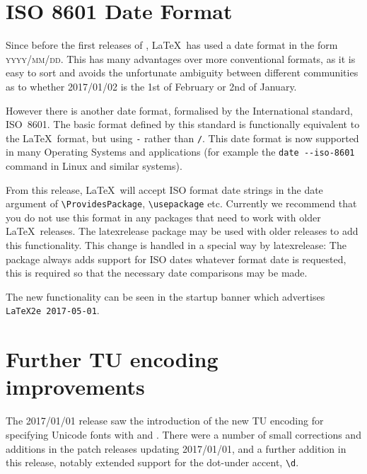 \documentclass{ltnews}
\begin{document}
\maketitle
\tableofcontents

\setlength{}

\section{ISO 8601 Date Format}
Since before the first releases of \LaTeXe, \LaTeX\ has used a date
format in the form \textsc{yyyy/mm/dd}. This has many advantages over more
conventional formats, as it is easy to sort and avoids the unfortunate
ambiguity between different communities as to whether 2017/01/02 is the
1st of February or 2nd of January.

However there is another date format, formalised by the
International standard, ISO~8601. The basic format defined by this
standard is functionally equivalent to the \LaTeX\ format, but using
\texttt{-} rather than \texttt{/}. This date format is now supported
in many Operating Systems and applications
(for example the \verb|date --iso-8601| command in Linux and similar systems).

From this release, \LaTeX\ will accept ISO format date strings in the
date argument of \verb|\ProvidesPackage|, \verb|\usepackage| etc.
Currently we recommend that you do not use this format in any packages
that need to work with older \LaTeX\ releases. 
The \textsf{latexrelease} package may be used with older releases to
 add this functionality. This change is handled in a special way  by
 \textsf{latexrelease}: The package always adds support for ISO dates
whatever format date is requested, this is required so that the
necessary date comparisons may be made.

The new functionality can be seen in the startup banner which
advertises \texttt{LaTeX2e 2017-05-01}.

\section{Further TU encoding improvements}
The 2017/01/01 release saw the introduction of the new TU encoding for
specifying Unicode fonts with  and
. There were a number of small corrections and additions
in the patch releases updating 2017/01/01, and a further addition in
this release, notably extended support for the dot-under accent,
\verb|\d|.
\end{document}
